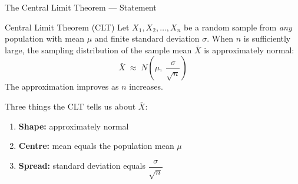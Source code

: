 \documentclass[aspectratio=169]{beamer}
\begin{document}
\begin{frame}{The Central Limit Theorem --- Statement}
    \begin{alertblock}{Central Limit Theorem (CLT)}
        Let $X_1, X_2, \ldots, X_n$ be a random sample from \emph{any} population with
        mean $\mu$ and finite standard deviation $\sigma$.  When $n$ is sufficiently large,
        the sampling distribution of the sample mean $\bar{X}$ is approximately normal:
        \[
            \bar{X} \;\approx\; N\!\left(\mu,\; \frac{\sigma}{\sqrt{n}}\right)
        \]
        The approximation improves as $n$ increases.
    \end{alertblock}
    \medskip
    Three things the CLT tells us about $\bar{X}$:
    \begin{enumerate}
        \item \textbf{Shape:} approximately normal
        \item \textbf{Centre:} mean equals the population mean $\mu$
        \item \textbf{Spread:} standard deviation equals $\dfrac{\sigma}{\sqrt{n}}$
    \end{enumerate}
\end{frame}
\end{document}
